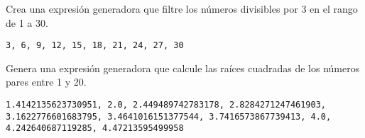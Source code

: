 \begin{exercise} Crea una expresión generadora que filtre los números divisibles por 3 en el rango de 1 a 30.
\begin{Shaded}
\begin{Highlighting}[]
\OperatorTok{=} \NormalTok{(}\NormalTok{, }\NormalTok{) }\OperatorTok{\%}  \OperatorTok{==} \NormalTok{)}
\NormalTok{(}\OperatorTok{*}\OperatorTok{=}\NormalTok{)  }
\end{Highlighting}
\end{Shaded}

\begin{verbatim}
3, 6, 9, 12, 15, 18, 21, 24, 27, 30

\end{verbatim}
\end{exercise}

\begin{exercise} Genera una expresión generadora que calcule las raíces cuadradas de los números pares entre 1 y 20.
\begin{Shaded}
\begin{Highlighting}[]
\OperatorTok{=} \NormalTok{(}\NormalTok{, }\NormalTok{, }\NormalTok{))}
\NormalTok{(}\OperatorTok{*}\OperatorTok{=}\NormalTok{)}
\end{Highlighting}
\end{Shaded}

\begin{verbatim}
1.4142135623730951, 2.0, 2.449489742783178, 2.8284271247461903, 3.1622776601683795, 3.4641016151377544, 3.7416573867739413, 4.0, 4.242640687119285, 4.47213595499958

\end{verbatim}
\end{exercise}

